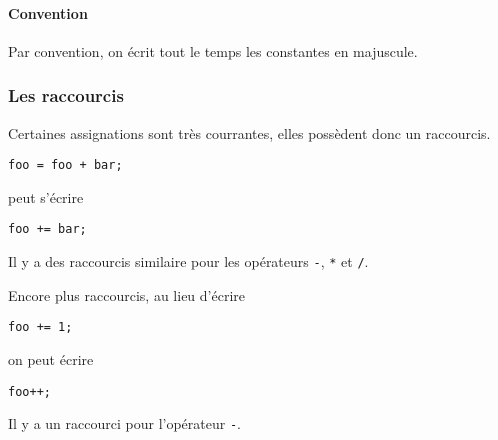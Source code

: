 \paragraph{Convention}
Par convention, on écrit tout le temps les constantes en majuscule.

\subsubsection{Les raccourcis}
Certaines assignations sont très courrantes, elles possèdent donc un raccourcis.
\begin{lstlisting}
foo = foo + bar;
\end{lstlisting}
peut s'écrire
\begin{lstlisting}
foo += bar;
\end{lstlisting}
Il y a des raccourcis similaire pour les opérateurs
\verb|-|, \verb|*| et \verb|/|.

Encore plus raccourcis, au lieu d'écrire
\begin{lstlisting}
foo += 1;
\end{lstlisting}
on peut écrire
\begin{lstlisting}
foo++;
\end{lstlisting}
Il y a un raccourci pour l'opérateur \verb|-|.

